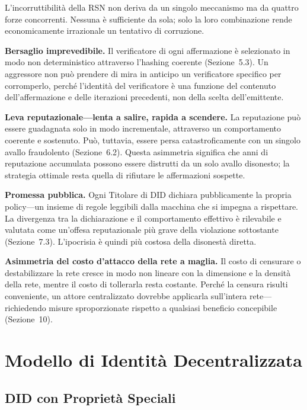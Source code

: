 \documentclass[11pt,a4paper,twocolumn]{article}
\begin{document}
L'incorruttibilità della RSN non deriva da un singolo meccanismo ma da quattro forze concorrenti. Nessuna è sufficiente da sola; solo la loro combinazione rende economicamente irrazionale un tentativo di corruzione.

\textbf{Bersaglio imprevedibile.} Il verificatore di ogni affermazione è selezionato in modo non deterministico attraverso l'hashing coerente (Sezione~5.3). Un aggressore non può prendere di mira in anticipo un verificatore specifico per corromperlo, perché l'identità del verificatore è una funzione del contenuto dell'affermazione e delle iterazioni precedenti, non della scelta dell'emittente.

\textbf{Leva reputazionale---lenta a salire, rapida a scendere.} La reputazione può essere guadagnata solo in modo incrementale, attraverso un comportamento coerente e sostenuto. Può, tuttavia, essere persa catastroficamente con un singolo avallo fraudolento (Sezione~6.2). Questa asimmetria significa che anni di reputazione accumulata possono essere distrutti da un solo avallo disonesto; la strategia ottimale resta quella di rifiutare le affermazioni sospette.

\textbf{Promessa pubblica.} Ogni Titolare di DID dichiara pubblicamente la propria policy---un insieme di regole leggibili dalla macchina che si impegna a rispettare. La divergenza tra la dichiarazione e il comportamento effettivo è rilevabile e valutata come un'offesa reputazionale più grave della violazione sottostante (Sezione~7.3). L'ipocrisia è quindi più costosa della disonestà diretta.

\textbf{Asimmetria del costo d'attacco della rete a maglia.} Il costo di censurare o destabilizzare la rete cresce in modo non lineare con la dimensione e la densità della rete, mentre il costo di tollerarla resta costante. Perché la censura risulti conveniente, un attore centralizzato dovrebbe applicarla sull'intera rete---richiedendo misure sproporzionate rispetto a qualsiasi beneficio concepibile (Sezione~10).

\section{Modello di Identità Decentralizzata}

\subsection{DID con Proprietà Speciali}
\end{document}
